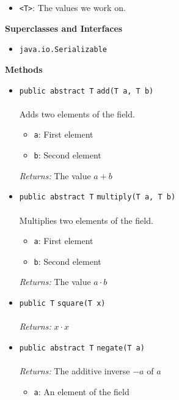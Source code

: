 \begin{itemize}
\item \lstinline|<T>|: The values we work on.
\end{itemize}


\textbf{\sffamily Superclasses and Interfaces}
\begin{itemize}
\item \lstinline|java.io.Serializable|
\end{itemize}



\textbf{\sffamily Methods}
\begin{itemize}
\item \lstinline|public abstract T| \lstinline|add|\lstinline|(T a, T b)|\\ \\[-0.6em]
Adds two elements of the field.
\begin{itemize}
\item \lstinline|a|: First element
\item \lstinline|b|: Second element
\end{itemize}

\emph{Returns:} The value $a + b$

\item \lstinline|public abstract T| \lstinline|multiply|\lstinline|(T a, T b)|\\ \\[-0.6em]
Multiplies two elements of the field.
\begin{itemize}
\item \lstinline|a|: First element
\item \lstinline|b|: Second element
\end{itemize}

\emph{Returns:} The value $a \cdot b$

\item \lstinline|public T| \lstinline|square|\lstinline|(T x)|\\ \\[-0.6em]
\emph{Returns:} $x \cdot x$



\item \lstinline|public abstract T| \lstinline|negate|\lstinline|(T a)|\\ \\[-0.6em]
\emph{Returns:} The additive inverse $-a$ of $a$
\begin{itemize}
\item \lstinline|a|: An element of the field
\end{itemize}




\end{itemize}

